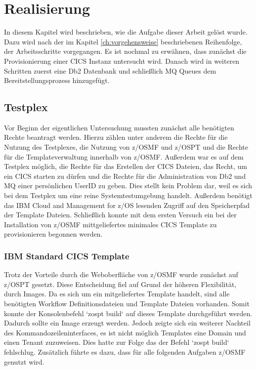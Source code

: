\chapter{Realisierung}\label{ch:realisierung}
In diesem Kapitel wird beschrieben, wie die Aufgabe dieser Arbeit gelöst wurde.
Dazu wird nach der im Kapitel \ref{ch:vorgehensweise} beschriebenen Reihenfolge, der Arbeitsschritte vorgegangen.
Es ist nochmal zu erwähnen, dass zunächst die Provisionierung einer CICS Instanz untersucht wird.
Danach wird in weiteren Schritten zuerst eine Db2 Datenbank und schließlich MQ Queues dem Bereitstellungsprozess hinzugefügt.

\section{Testplex}
Vor Beginn der eigentlichen Untersuchung mussten zunächst alle benötigten Rechte beantragt werden.
Hierzu zählen unter anderem die Rechte für die Nutzung des Testplexes, die Nutzung von z/OSMF und z/OSPT und die Rechte für die Templateverwaltung innerhalb von z/OSMF.
Außerdem war es auf dem Testplex möglich, die Rechte für das Erstellen der CICS Dateien, das Recht, um ein CICS starten zu dürfen und die Rechte für die Administration von Db2 und MQ einer persönlichen UserID zu geben.
Dies stellt kein Problem dar, weil es sich bei dem Testplex um eine reine Systemtestumgebung handelt.
Außerdem benötigt das IBM Cloud and Management for z/OS lesenden Zugriff auf den Speicherpfad der Template Dateien.
Schließlich konnte mit dem ersten Versuch ein bei der Installation von z/OSMF mittgeliefertes minimales CICS Template zu provisionieren begonnen werden.

\subsection{IBM Standard CICS Template}
Trotz der Vorteile durch die Weboberfläche von z/OSMF wurde zunächst auf z/OSPT gesetzt.
Diese Entscheidung fiel auf Grund der höheren Flexibilität, durch Images.
Da es sich um ein mitgeliefertes Template handelt, sind alle benötigten Workflow Definitionsdateien und Template Dateien vorhanden.
Somit konnte der Konsolenbefehl `zospt build` auf dieses Template durchgeführt werden.
Dadurch sollte ein Image erzeugt werden.
Jedoch zeigte sich ein weiterer Nachteil des Kommandozeileninterfaces, es ist nicht möglich Templates eine Domain und einen Tenant zuzuweisen.
Dies hatte zur Folge das der Befehl `zospt build` fehlschlug.
Zusätzlich führte es dazu, dass für alle folgenden Aufgaben z/OSMF genutzt wird.


